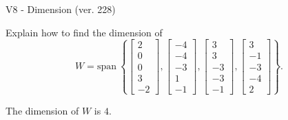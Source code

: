 \begin{exercise}
  \begin{exerciseTitle}V8 - Dimension (ver. 228)\end{exerciseTitle}
  \begin{exerciseStatement}
    Explain how to find the dimension of 
\[W=\mathrm{span}\ \left\{\left[\begin{array}{r}
2 \\
0 \\
0 \\
3 \\
-2
\end{array}\right] , \left[\begin{array}{r}
-4 \\
-4 \\
-3 \\
1 \\
-1
\end{array}\right] , \left[\begin{array}{r}
3 \\
3 \\
-3 \\
-3 \\
-1
\end{array}\right] , \left[\begin{array}{r}
3 \\
-1 \\
-3 \\
-4 \\
2
\end{array}\right]\right\}.\]



  \end{exerciseStatement}
  \begin{exerciseAnswer}
   The dimension of \(W\) is  \(4\).
  


  \end{exerciseAnswer}
\end{exercise}